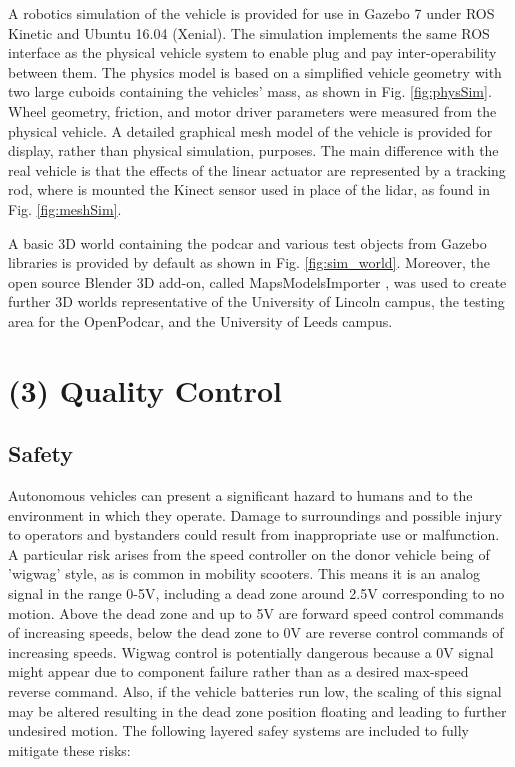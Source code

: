 \documentclass[a4paper]{article}
\begin{document}
	
	
	A robotics simulation of the vehicle is provided for use in Gazebo 7 \cite{koenig2004design} under ROS Kinetic and Ubuntu 16.04 (Xenial). The simulation implements the same ROS interface as the physical vehicle system to enable plug and pay inter-operability between them. The physics model is based on a simplified vehicle geometry with two large cuboids containing the vehicles’ mass, as shown in Fig. \ref{fig:physSim}. Wheel geometry, friction, and motor driver parameters were measured from the physical vehicle. A detailed graphical mesh model of the vehicle is provided for display, rather than physical simulation, purposes. The main difference with the real vehicle is that the effects of the linear actuator are represented by a tracking rod, where is mounted the Kinect sensor used in place of the lidar, as found in Fig. \ref{fig:meshSim}.
	
	A basic 3D world containing the podcar and various test objects from Gazebo libraries is provided by default as shown in Fig. \ref{fig:sim_world}. Moreover, the open source Blender 3D add-on, called MapsModelsImporter \cite{michelmaps}, was used to create further 3D worlds representative of the University of Lincoln campus, the testing area for the OpenPodcar, and the University of Leeds campus. 
	
	\section{(3) Quality Control}\label{h.f8237gmzmwc6}
	
	\subsection{Safety}\label{h.v60aduckfisj}
	
	Autonomous vehicles can present a significant hazard to humans and to the environment in which they operate. Damage to surroundings and possible injury to operators and bystanders could result from inappropriate use or malfunction. A particular risk arises from the speed controller on the donor vehicle being of 'wigwag' style, as is common in mobility scooters. This means it is an analog signal in the range 0-5V, including a dead zone around 2.5V corresponding to no motion. Above the dead zone and up to 5V are forward speed control commands of increasing speeds, below the dead zone to 0V are reverse control commands of increasing speeds. Wigwag control is  potentially dangerous because a 0V signal might appear due to component failure rather than as a desired max-speed reverse command. Also, if the vehicle batteries run low, the scaling of this signal may be altered resulting in the dead zone position floating and leading to further undesired motion. The following layered safey systems are included to fully mitigate these risks:
	
\end{document}
